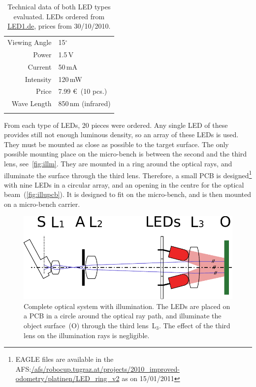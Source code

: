 \documentclass[12pt,a4paper]{article}
\begin{document}
\begin{table}[htbp]
\begin{minipage}{0.45\textwidth}
\begin{tabular}{r|l}
       Viewing Angle  & 15$^\circ$     \\
       Power & 1.5\,V     \\
       Current & 50\,mA     \\
       Intensity & 120\,mW     \\
       Price & 7.99 \euro\ (10 pcs.)     \\
       Wave Length & 850\,nm (infrared)     \\
       &
    \end{tabular}
  \end{minipage}
  \caption{Technical data of both LED types evaluated.
  LEDs ordered from \href{http://www.led1.de}{LED1.de}, prices from 30/10/2010.}
  \label{table:leds}
\end{table}

From each type of LEDs, 20 pieces were ordered.
Any single LED of these provides still not enough luminous density, so an array of these LEDs is used.
They must be mounted as close as possible to the target surface.
The only possible mounting place on the micro-bench is between the second and the third lens, see~\autoref{fig:illm}.
They are mounted in a ring around the optical rays, and illuminate the surface through the third lens.
Therefore, a small PCB is designed\footnote{EAGLE files are available in the AFS:\url{/afs/robocup.tugraz.at/projects/2010_improved-odometry/platinen/LED_ring_v2} as on 15/01/2011} with nine LEDs in a circular array, and an opening in the centre for the optical beam~(\autoref{fig:illupcb}).
It is designed to fit on the micro-bench, and is then mounted on a micro-bench carrier.

\begin{figure}[htbp]
\begin{center}
\includegraphics[width=0.8\columnwidth]{figures/sketch-optic.pdf}
\caption{\label{fig:illm}
Complete optical system with illumination.
The LEDs are placed on a PCB in a circle around the optical ray path, and illuminate the object surface~(O) through the third lens~L$_3$.
The effect of the third lens on the illumination rays is negligible.
}
\end{center}
\end{figure}
\end{document}
